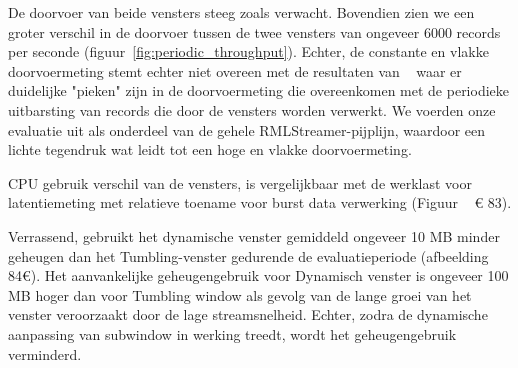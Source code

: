 De doorvoer van beide vensters steeg zoals verwacht.
Bovendien zien we een groter verschil in de doorvoer tussen de 
twee vensters van ongeveer 6000 records per seconde 
(figuur~\ref{fig:periodic_throughput}). Echter, de
constante en vlakke doorvoermeting stemt echter niet overeen 
met de resultaten van ~\cite{evalution_of_spe} waar er duidelijke "pieken" zijn in 
de doorvoermeting die overeenkomen met de periodieke uitbarsting 
van records die door de vensters worden verwerkt. 
We voerden onze evaluatie uit als onderdeel van de gehele RMLStreamer-pijplijn, waardoor 
een lichte tegendruk 
wat leidt tot een hoge en vlakke doorvoermeting. 


CPU gebruik verschil van de vensters, is vergelijkbaar met de 
werklast voor latentiemeting met relatieve toename voor 
burst data verwerking
(Figuur ~ € 83). 

Verrassend,
gebruikt het dynamische venster 
gemiddeld ongeveer 10 MB minder geheugen dan het Tumbling-venster gedurende de evaluatieperiode (afbeelding ~ 84€). 
Het aanvankelijke geheugengebruik voor Dynamisch venster is ongeveer 100 MB hoger dan voor 
Tumbling window als gevolg van de lange groei van het venster 
veroorzaakt door de lage streamsnelheid. Echter, zodra 
de dynamische aanpassing van subwindow in werking treedt, wordt het geheugengebruik verminderd.


